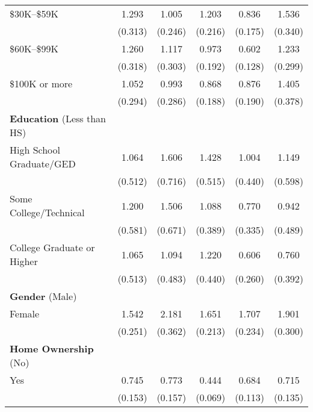 \begin{table}[htbp]
\begin{tabular}{l*{5}{c}}
\$30K--\$59K        &       1.293         &       1.005         &       1.203         &       0.836         &       1.536\sym{*}  \\
                    &     (0.313)         &     (0.246)         &     (0.216)         &     (0.175)         &     (0.340)         \\
\$60K--\$99K        &       1.260         &       1.117         &       0.973         &       0.602\sym{**} &       1.233         \\
                    &     (0.318)         &     (0.303)         &     (0.192)         &     (0.128)         &     (0.299)         \\
\$100K or more      &       1.052         &       0.993         &       0.868         &       0.876         &       1.405         \\
                    &     (0.294)         &     (0.286)         &     (0.188)         &     (0.190)         &     (0.378)         \\
\textbf{Education} (Less than HS) &  &  &  &   & \\
High School Graduate/GED&       1.064         &       1.606         &       1.428         &       1.004         &       1.149         \\
                    &     (0.512)         &     (0.716)         &     (0.515)         &     (0.440)         &     (0.598)         \\
Some College/Technical&       1.200         &       1.506         &       1.088         &       0.770         &       0.942         \\
                    &     (0.581)         &     (0.671)         &     (0.389)         &     (0.335)         &     (0.489)         \\
College Graduate or Higher&       1.065         &       1.094         &       1.220         &       0.606         &       0.760         \\
                    &     (0.513)         &     (0.483)         &     (0.440)         &     (0.260)         &     (0.392)         \\
\textbf{Gender} (Male) &  &  &  &   & \\
Female              &       1.542\sym{***}&       2.181\sym{***}&       1.651\sym{***}&       1.707\sym{***}&       1.901\sym{***}\\
                    &     (0.251)         &     (0.362)         &     (0.213)         &     (0.234)         &     (0.300)         \\
\textbf{Home Ownership} (No) &  &  &  &   & \\
Yes                 &       0.745         &       0.773         &       0.444\sym{***}&       0.684\sym{**} &       0.715\sym{*}  \\
                    &     (0.153)         &     (0.157)         &     (0.069)         &     (0.113)         &     (0.135)         \\


\end{tabular}
\end{table}
